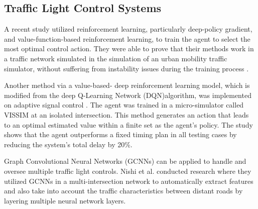 

\subsection{Traffic Light Control Systems}
A recent study utilized reinforcement learning, particularly deep-policy gradient, and value-function-based reinforcement learning, to train the agent to select the most optimal control action. They were able to prove that their methods work in a traffic network simulated in the simulation of an urban mobility traffic simulator, without suffering from instability issues during the training process \cite{mousavi2017traffic}.

Another method via a value-based- deep reinforcement learning model, which is modified from the deep Q-Learning Network (DQN)algorithm, was implemented on adaptive signal control \cite{wan2018value}. The agent was trained in a micro-simulator called VISSIM at an isolated intersection. This method generates an action that leads to an optimal estimated value within a finite set as the agent’s policy. The study shows that the agent outperforms a fixed timing plan in all testing cases by reducing the system's total delay by 20\%.

Graph Convolutional Neural Networks (GCNNs) can be applied to handle and oversee multiple traffic light controls. Nishi et al. conducted research where they utilized GCNNs in a multi-intersection network to automatically extract features and also take into account the traffic characteristics between distant roads by layering multiple neural network layers.\cite{nishi_traffic_2018}

